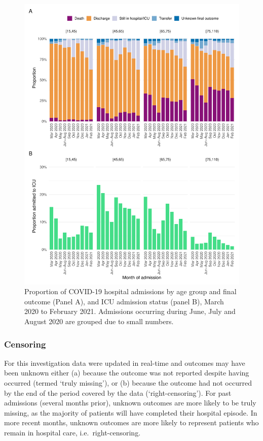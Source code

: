 \begin{figure}[htbp!]
    \centering
    \includegraphics[width=\textwidth]{sari_icu_admission.pdf}
    \caption[Proportion of COVID-19 hospital admissions by age group, final outcome, and ICU admission status]{Proportion of COVID-19 hospital admissions by age group and final outcome (Panel A), and ICU admission status (panel B), March 2020 to February 2021. Admissions occurring during June, July and August 2020 are grouped due to small numbers.}\label{fig:sari-icu-admission}
\end{figure}

\subsubsection{Censoring}

For this investigation data were updated in real-time and outcomes may have been unknown either (a) because the outcome was not reported despite having occurred (termed `truly missing'), or (b) because the outcome had not occurred by the end of the period covered by the data (`right-censoring'). For past admissions (several months prior), unknown outcomes are more likely to be truly missing, as the majority of patients will have completed their hospital episode. In more recent months, unknown outcomes are more likely to represent patients who remain in hospital care, i.e.\ right-censoring.

